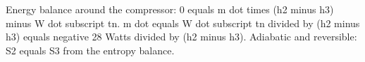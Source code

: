 Energy balance around the compressor:
0 equals m dot times (h2 minus h3) minus W dot subscript tn.
m dot equals W dot subscript tn divided by (h2 minus h3) equals negative 28 Watts divided by (h2 minus h3).
Adiabatic and reversible: S2 equals S3 from the entropy balance.